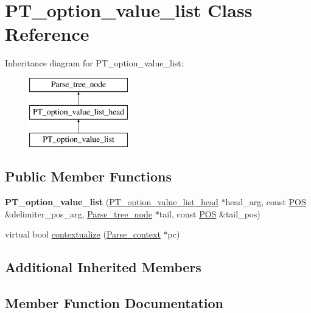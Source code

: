 \hypertarget{classPT__option__value__list}{}\section{P\+T\+\_\+option\+\_\+value\+\_\+list Class Reference}
\label{classPT__option__value__list}
Inheritance diagram for P\+T\+\_\+option\+\_\+value\+\_\+list\+:\begin{figure}[H]
\begin{center}
\leavevmode
\includegraphics[height=3.000000cm]{classPT__option__value__list}
\end{center}
\end{figure}
\subsection*{Public Member Functions}
\begin{DoxyCompactItemize}
\item 
\mbox{\label{classPT__option__value__list_af2a6e7504f5629441634e8b060bafa22}} 
{\bfseries P\+T\+\_\+option\+\_\+value\+\_\+list} (\mbox{\hyperlink{classPT__option__value__list__head}{P\+T\+\_\+option\+\_\+value\+\_\+list\+\_\+head}} $\ast$head\+\_\+arg, const \mbox{\hyperlink{structYYLTYPE}{P\+OS}} \&delimiter\+\_\+pos\+\_\+arg, \mbox{\hyperlink{classParse__tree__node}{Parse\+\_\+tree\+\_\+node}} $\ast$tail, const \mbox{\hyperlink{structYYLTYPE}{P\+OS}} \&tail\+\_\+pos)
\item 
virtual bool \mbox{\hyperlink{classPT__option__value__list_a11d23499d057d978727592d5b9d366c2}{contextualize}} (\mbox{\hyperlink{structParse__context}{Parse\+\_\+context}} $\ast$pc)
\end{DoxyCompactItemize}
\subsection*{Additional Inherited Members}


\subsection{Member Function Documentation}
\mbox{\label{classPT__option__value__list_a11d23499d057d978727592d5b9d366c2}} 
